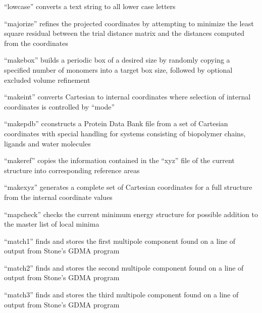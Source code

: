 \documentclass[letterpaper,11pt,english]{sphinxmanual}
\begin{document}
“lowcase” converts a text string to all lower case letters


“majorize” refines the projected coordinates by attempting to
minimize the least square residual between the trial distance
matrix and the distances computed from the coordinates



“makebox” builds a periodic box of a desired size by randomly
copying a specified number of monomers into a target box size,
followed by optional excluded volume refinement


“makeint” converts Cartesian to internal coordinates where
selection of internal coordinates is controlled by “mode”


“makepdb” cconstructs a Protein Data Bank file from a set
of Cartesian coordinates with special handling for systems
consisting of biopolymer chains, ligands and water molecules


“makeref” copies the information contained in the “xyz” file
of the current structure into corresponding reference areas


“makexyz” generates a complete set of Cartesian coordinates
for a full structure from the internal coordinate values


“mapcheck” checks the current minimum energy structure
for possible addition to the master list of local minima


“match1” finds and stores the first multipole component found
on a line of output from Stone’s GDMA program


“match2” finds and stores the second multipole component found
on a line of output from Stone’s GDMA program


“match3” finds and stores the third multipole component found
on a line of output from Stone’s GDMA program
\end{document}
